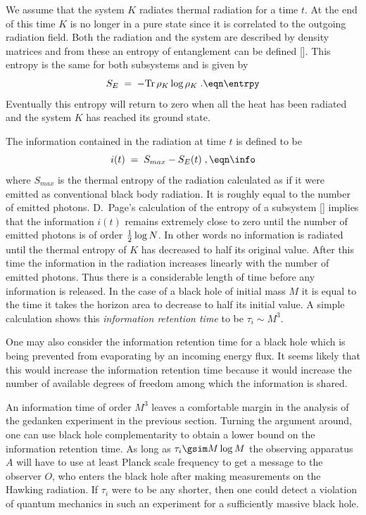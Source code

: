 We assume that the system $K$ radiates thermal radiation for a time
$t$.  At the end of this time $K$ is no longer in a pure state since
it is correlated to the outgoing radiation field.  Both the radiation
and the system are described by density matrices and from these an
entropy of entanglement can be defined [\stu].  This entropy is the
same for both subsystems and is given by
$$
S_E \; = \; - {\rm Tr}\, \rho_K \log{\rho_K} \;.
\eqn\entrpy
$$
Eventually this entropy will return to zero when all the heat has
been radiated and the system $K$ has reached its ground state.

The information contained in the radiation at time $t$ is defined to
be
$$
i(t) \; = \; S_{max} - S_E (t) \;,
\eqn\info
$$
where $S_{max}$ is the thermal entropy of the radiation calculated as
if it were emitted as conventional black body radiation.  It is
roughly equal to the number of emitted photons.  D.~Page's
calculation of the entropy of a subsystem [\page] implies that the
information $i(t)$ remains extremely close to zero until the number
of emitted photons is of order ${1 \over 2} \log{N}$.  In other words
no information is radiated until the thermal entropy of $K$ has
decreased to half its original value.  After this time the
information in the radiation increases linearly with the number of
emitted photons.  Thus there is a considerable length of time before
any information is released.  In the case of a black hole of initial
mass $M$ it is equal to the time it takes the horizon area to
decrease to half its initial value.  A simple calculation shows this
{\it information retention time} to be $\tau_i \sim M^3$.

One may also consider the information retention time for a black hole
which is being prevented from evaporating by an incoming energy flux.
 It seems likely that this would increase the information retention
time because it would increase the number of available degrees of
freedom among which the information is shared.

An information time of order $M^3$ leaves a comfortable margin in the
analysis of the gedanken experiment in the previous section.  Turning
the argument around, one can use black hole complementarity to obtain
a lower bound on the information retention time.  As long as $\tau_i
\gsim M \log{M}$ the observing apparatus $A$ will have to use at
least Planck scale frequency to get a message to the observer $O$,
who enters the black hole after making measurements on the Hawking
radiation.  If $\tau_i$ were to be any shorter, then one could detect
a violation of quantum mechanics in such an experiment for a
sufficiently massive black hole.

